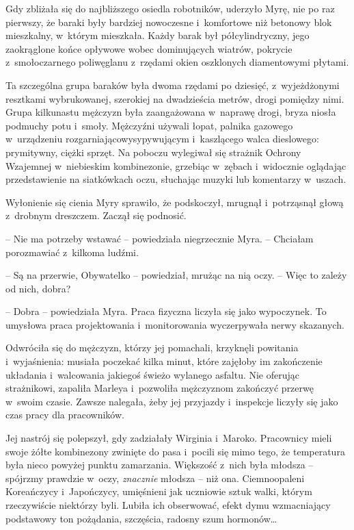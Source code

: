 \documentclass[oneside,polish,11pt,sfheadings]{mwbk}
\begin{document}
Gdy zbliżała się do najbliższego osiedla robotników, uderzyło Myrę, nie
po raz pierwszy, że baraki były bardziej nowoczesne i~komfortowe niż
betonowy blok mieszkalny, w~którym mieszkała. Każdy barak był
półcylindryczny, jego zaokrąglone końce opływowe wobec dominujących
wiatrów, pokrycie z~smoło\dywiz czarnego poliwęglanu z~rzędami okien
oszklonych diamentowymi płytami.

Ta szczególna grupa baraków była dwoma rzędami po dziesięć, z~wyjeżdżonymi resztkami wybrukowanej, szerokiej na dwadzieścia metrów,
drogi pomiędzy nimi. Grupa kilkunastu mężczyzn była zaangażowana w~naprawę drogi, bryza niosła podmuchy potu i~smoły. Mężczyźni używali
łopat, palnika gazowego w~urządzeniu rozgarniająco\dywiz wysypywującym i~kaszlącego walca dieslowego: prymitywny, ciężki sprzęt. Na poboczu
wylegiwał się strażnik Ochrony Wzajemnej w~niebieskim kombinezonie,
grzebiąc w~zębach i~widocznie oglądając przedstawienie na siatkówkach
oczu, słuchając muzyki lub komentarzy w~uszach.

Wyłonienie się cienia Myry sprawiło, że podskoczył, mrugnął i~potrząsnął
głową z~drobnym dreszczem. Zaczął się podnosić.

-- Nie ma potrzeby wstawać -- powiedziała niegrzecznie Myra. -- Chciałam
porozmawiać z~kilkoma ludźmi.

-- Są na przerwie, Obywatelko -- powiedział, mrużąc na nią oczy. -- Więc to
zależy od nich, dobra?

-- Dobra -- powiedziała Myra. Praca fizyczna liczyła się jako wypoczynek.
To umysłowa praca projektowania i~monitorowania wyczerpywała nerwy
skazanych.

Odwróciła się do mężczyzn, którzy jej pomachali, krzyknęli powitania i~wyjaśnienia: musiała poczekać kilka minut, które zajęłoby im zakończenie
układania i~walcowania jakiegoś świeżo wylanego asfaltu. Nie oferując
strażnikowi, zapaliła Marleya i~pozwoliła mężczyznom zakończyć przerwę w~swoim czasie. Zawsze nalegała, żeby jej przyjazdy i~inspekcje liczyły
się jako czas pracy dla pracowników.

Jej nastrój się polepszył, gdy zadziałały Wirginia i~Maroko. Pracownicy
mieli swoje żółte kombinezony zwinięte do pasa i~pocili się mimo tego,
że temperatura była nieco powyżej punktu zamarzania. Większość z~nich
była młodsza -- spójrzmy prawdzie w~oczy, \textit{znacznie} młodsza -- niż
ona. Ciemno\dywiz opaleni Koreańczycy i~Japończycy, umięśnieni jak uczniowie
sztuk walki, którym rzeczywiście niektórzy byli. Lubiła ich obserwować,
efekt dymu wzmacniający podstawowy ton pożądania, szczęścia, radosny
szum hormonów\ldots
\end{document}

